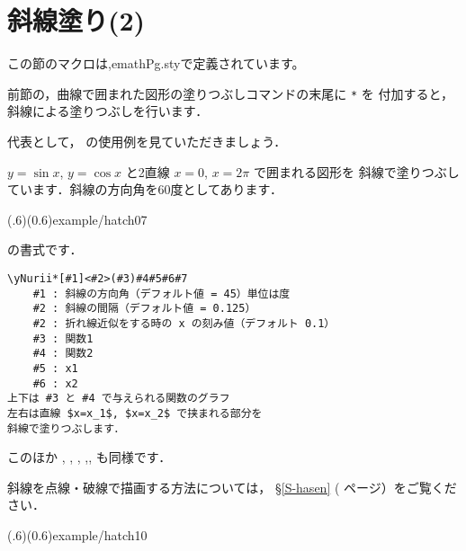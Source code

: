 \section{斜線塗り(2)}
この節のマクロは,\textsf{emathPg.sty}で定義されています。

前節の，曲線で囲まれた図形の塗りつぶしコマンドの末尾に \verb+*+ を
付加すると，斜線による塗りつぶしを行います．

代表として， の使用例を見ていただきましょう．

$y=\sin x$, $y=\cos x$ と2直線 $x=0$, $x=2\pi$ で囲まれる図形を
斜線で塗りつぶしています．斜線の方向角を60度としてあります．

\showexample[2曲線で囲まれる図形の斜線塗り](.6)(0.6){example/hatch07}

の書式です．
\begin{boxnote}
\begin{verbatim}
\yNurii*[#1]<#2>(#3)#4#5#6#7
    #1 : 斜線の方向角（デフォルト値 = 45）単位は度
    #2 : 斜線の間隔（デフォルト値 = 0.125）
    #2 : 折れ線近似をする時の x の刻み値（デフォルト 0.1）
    #3 : 関数1
    #4 : 関数2
    #5 : x1
    #6 : x2
上下は #3 と #4 で与えられる関数のグラフ
左右は直線 $x=x_1$, $x=x_2$ で挟まれる部分を
斜線で塗りつぶします．
\end{verbatim}
\end{boxnote}

このほか , , , ,,
 も同様です．

斜線を点線・破線で描画する方法については，
§\ref{S-hasen} (\pageref{S-hasen} ページ）をご覧ください．

\showexample[点線による斜線塗り](.6)(0.6){example/hatch10}
